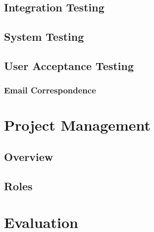 \documentclass[12pt]{article}
\begin{document}
  \subsection{Integration Testing}
  \subsection{System Testing}
  \subsection{User Acceptance Testing}
    \subsubsection{Email Correspondence}
\section{Project Management}
  \subsection{Overview}
  \subsection{Roles}
\section{Evaluation}
\end{document}
